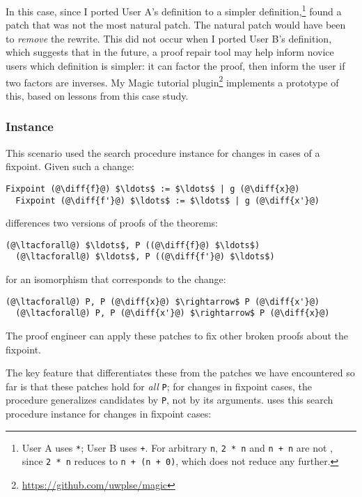 In this case, since I ported User A's definition to a simpler 
definition,\footnote{User A uses \lstinline{*}; User B uses \lstinline{+}. 
For arbitrary \lstinline{n}, \lstinline{2 * n} and \lstinline{n + n} are not , since \lstinline{2 * n} reduces to \lstinline{n + (n + 0)}, which does not reduce any further.}
\sysname found a patch that was not the most natural patch.
The natural patch would have been to \emph{remove} the rewrite.
This did not occur when I ported User B's definition,
which suggests that in the future, a proof repair tool may help inform novice users which definition is simpler:
it can factor the proof,  
then inform the user if two factors are inverses.
My Magic tutorial plugin\footnote{\url{https://github.com/uwplse/magic}} %
implements a prototype of this, based on lessons from this case study.

\subsubsection*{Instance}

This scenario used the search procedure instance for changes in cases of a fixpoint.
Given such a change:

\begin{lstlisting}[language=coq]
  Fixpoint (@\diff{f}@) $\ldots$ := $\ldots$ | g (@\diff{x}@)
  Fixpoint (@\diff{f'}@) $\ldots$ := $\ldots$ | g (@\diff{x'}@)
\end{lstlisting}
\sysname differences two versions of proofs of the theorems:

\begin{lstlisting}[language=coq]
  (@\ltacforall@) $\ldots$, P ((@\diff{f}@) $\ldots$)
  (@\ltacforall@) $\ldots$, P ((@\diff{f'}@) $\ldots$)
\end{lstlisting}
for an isomorphism that corresponds to the change:

\begin{lstlisting}[language=coq]
  (@\ltacforall@) P, P (@\diff{x}@) $\rightarrow$ P (@\diff{x'}@)
  (@\ltacforall@) P, P (@\diff{x'}@) $\rightarrow$ P (@\diff{x}@)
\end{lstlisting}
The proof engineer can apply these patches to fix other broken proofs about the fixpoint.

The key feature that differentiates these from the patches we have encountered so far is that
these patches hold for \emph{all} \lstinline{P}; for changes in fixpoint cases, the procedure generalizes
candidates by \lstinline{P}, not by its arguments.
\sysname uses this search procedure instance for changes in fixpoint cases:

